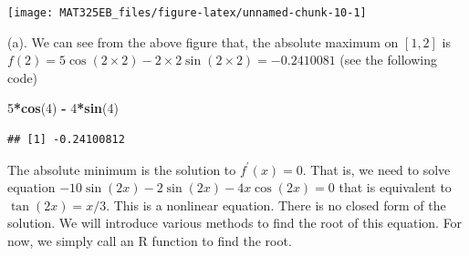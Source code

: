 \documentclass[
]{book}
\newenvironment{Shaded}{\begin{snugshade}}{\end{snugshade}}
\newcommand{\AttributeTok}[1]{\textcolor[rgb]{0.13,0.29,0.53}{#1}}
\newcommand{\CommentTok}[1]{\textcolor[rgb]{0.56,0.35,0.01}{\textit{#1}}}
\newcommand{\ControlFlowTok}[1]{\textcolor[rgb]{0.13,0.29,0.53}{\textbf{#1}}}
\newcommand{\DecValTok}[1]{\textcolor[rgb]{0.00,0.00,0.81}{#1}}
\newcommand{\FloatTok}[1]{\textcolor[rgb]{0.00,0.00,0.81}{#1}}
\newcommand{\FunctionTok}[1]{\textcolor[rgb]{0.13,0.29,0.53}{\textbf{#1}}}
\newcommand{\NormalTok}[1]{#1}
\newcommand{\OtherTok}[1]{\textcolor[rgb]{0.56,0.35,0.01}{#1}}
\newcommand{\SpecialCharTok}[1]{\textcolor[rgb]{0.81,0.36,0.00}{\textbf{#1}}}
\begin{document}
\begin{center}\texttt{[image: MAT325EB\_files/figure-latex/unnamed-chunk-10-1]} \end{center}

(a). We can see from the above figure that, the absolute maximum on \([1, 2]\) is \(f(2) = 5\cos(2\times 2) - 2\times 2 \sin(2\times 2) = -0.2410081\) (see the following code)

\begin{Shaded}
\begin{Highlighting}[]
\DecValTok{5}\SpecialCharTok{*}\FunctionTok{cos}\NormalTok{(}\DecValTok{4}\NormalTok{) }\SpecialCharTok{{-}} \DecValTok{4}\SpecialCharTok{*}\FunctionTok{sin}\NormalTok{(}\DecValTok{4}\NormalTok{)}
\end{Highlighting}
\end{Shaded}

\begin{verbatim}
## [1] -0.24100812
\end{verbatim}

The absolute minimum is the solution to \(f^\prime(x) = 0\). That is, we need to solve equation \(-10\sin(2x) - 2\sin(2x) - 4x\cos(2x) = 0\) that is equivalent to \(\tan(2x) = x/3\). This is a nonlinear equation. There is no closed form of the solution. We will introduce various methods to find the root of this equation. For now, we simply call an R function to find the root.

\begin{Shaded}
\end{Shaded}
\end{document}
